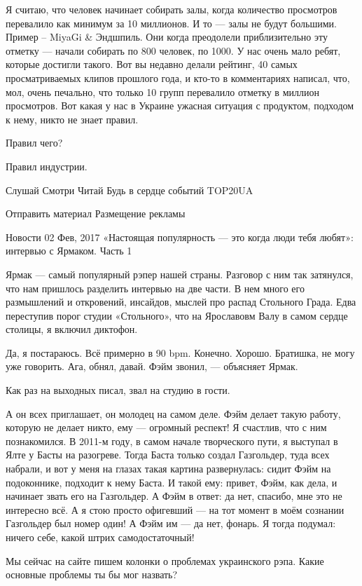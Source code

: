 Я считаю, что человек начинает собирать залы, когда количество просмотров
перевалило как минимум за 10 миллионов. И то --- залы не будут большими. Пример –
MiyaGi & Эндшпиль. Они когда преодолели приблизительно эту отметку --- начали
собирать по 800 человек, по 1000. У нас очень мало ребят, которые достигли
такого. Вот вы недавно делали рейтинг, 40 самых просматриваемых клипов прошлого
года, и кто-то в комментариях написал, что, мол, очень печально, что только 10
групп перевалило отметку в миллион просмотров. Вот какая у нас в Украине
ужасная ситуация с продуктом, подходом к нему, никто не знает правил.

Правил чего?

Правил индустрии.



    Слушай
    Смотри
    Читай
    Будь в сердце событий
    TOP20UA

    Отправить материал
    Размещение рекламы

Новости
02 Фев, 2017
«Настоящая популярность --- это когда люди тебя любят»: интервью с Ярмаком. Часть 1

Ярмак --- самый популярный рэпер нашей страны. Разговор с ним так затянулся, что нам пришлось разделить интервью на две части. В нем много его размышлений и откровений, инсайдов, мыслей про распад Стольного  Града. Едва переступив порог студии «Стольного», что на Ярославовм Валу в самом сердце столицы, я включил диктофон.  

Да, я постараюсь. Всё примерно в 90 bpm. Конечно. Хорошо. Братишка, не могу уже говорить. Ага, обнял, давай. Фэйм звонил, --- объясняет Ярмак.

Как раз на выходных писал, звал на студию в гости.

А он всех приглашает, он молодец на самом деле. Фэйм делает такую работу, которую не делает никто, ему --- огромный респект! Я счастлив, что с ним познакомился. В 2011-м году, в самом начале творческого пути, я выступал в Ялте у Басты на разогреве. Тогда Баста только создал Газгольдер, туда всех набрали, и вот у меня на глазах такая картина развернулась: сидит Фэйм на подоконнике, подходит к нему Баста. И такой ему: привет, Фэйм, как дела, и начинает звать его на Газгольдер. А Фэйм в ответ: да нет, спасибо, мне это не интересно всё. А я стою просто офигевший --- на тот момент в моём сознании Газгольдер был номер один! А Фэйм им --- да нет, фонарь. Я тогда подумал: ничего себе, какой штрих самодостаточный!

Мы сейчас на сайте пишем колонки о проблемах украинского рэпа. Какие основные проблемы ты бы мог назвать?

